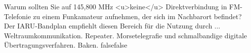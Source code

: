     {Warum sollten Sie auf 145,800 MHz <u>keine</u> Direktverbindung in FM-Telefonie zu einem Funkamateur aufnehmen, der sich im Nachbarort befindet? Der IARU-Bandplan empfiehlt diesen Bereich für die Nutzung durch ...}
    {Weltraumkommunikation.}
    {Repeater.}
    {Morsetelegrafie und schmalbandige digitale Übertragungsverfahren.}
    {Baken.}
    {false}{false}